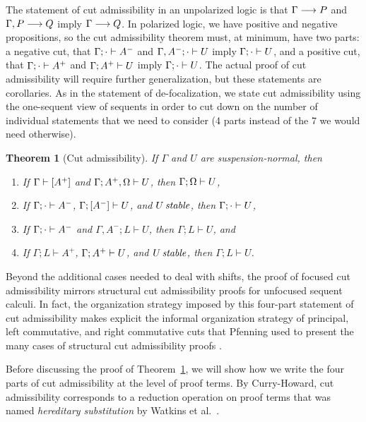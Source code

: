 \documentclass[acmtocl]{robtrans}\pdfoutput=1
\newtheorem{theorem}{Theorem}
\newcommand{\seq}[2]{{#1} \longrightarrow {#2} \mathstrut}
\newcommand{\efoc}[3]{{#1}; {#2} \vdash {#3}}
\newcommand{\rfoc}[2]{{#1} \vdash [{#2}] \mathstrut}
\newcommand{\lfoc}[3]{{#1}; [{#2}] \vdash {#3} \mathstrut}
\newcommand{\ifoc}[3]{{#1}; {#2} \vdash {#3} \mathstrut}
\newcommand{\stable}[1]{{#1}\,\mathit{stable} \mathstrut}
\begin{document}
The statement of cut admissibility in an unpolarized logic is that
$\seq{\Gamma}{P}$ and $\seq{\Gamma, P}{Q}$ imply $\seq{\Gamma}{Q}$. In
polarized logic, we have positive and negative propositions, so the
cut admissibility theorem must, at minimum, have two parts: a negative
cut, that $\ifoc{\Gamma}{\cdot}{A^-}$ and $\ifoc{\Gamma,
  A^-}{\cdot}{U}$ imply $\ifoc{\Gamma}{\cdot}{U}$, and a positive cut,
that $\ifoc{\Gamma}{\cdot}{A^+}$ and $\ifoc{\Gamma}{A^+}{U}$ imply
$\ifoc{\Gamma}{\cdot}{U}$. The actual proof of cut admissibility will
require further generalization, but these statements are corollaries.
As in the statement of de-focalization, we state cut admissibility
using the one-sequent view of sequents in order to cut down on the
number of individual statements that we need to consider (4 parts
instead of the 7 we would need otherwise).

\begin{theorem}[Cut admissibility]
If $\Gamma$ and $U$ are suspension-normal, then\label{thm:cut}

\begin{enumerate}
\item If $\rfoc{\Gamma}{A^+}$ and $\ifoc{\Gamma}{A^+, \Omega}{U}$, then
      $\ifoc{\Gamma}{\Omega}{U}$,
\item If $\ifoc{\Gamma}{\cdot}{A^-}$, $\lfoc{\Gamma}{A^-}{U}$, 
      and $\stable{U}$, then
      $\ifoc{\Gamma}{\cdot}{U}$,
\item If $\ifoc{\Gamma}{\cdot}{A^-}$ and $\efoc{\Gamma, A^-}{L}{U}$, then 
      $\efoc{\Gamma}{L}{U}$, and
\item If $\efoc{\Gamma}{L}{A^+}$, $\ifoc{\Gamma}{A^+}{U}$,
      and $\stable{U}$,
      then $\efoc{\Gamma}{L}{U}$.
\end{enumerate}
\end{theorem}

\noindent
Beyond the additional cases needed to deal with shifts, the proof of
focused cut admissibility mirrors structural cut admissibility proofs
for unfocused sequent calculi.  In fact, the organization strategy
imposed by this four-part statement of cut admissibility makes
explicit the informal organization strategy of principal, 
left commutative, and right commutative cuts that Pfenning used to
present the many cases of structural cut admissibility proofs
\cite{pfenning00structural}.  

Before discussing the proof of Theorem~\ref{thm:cut}, we will show how
we write the four parts of cut admissibility at the level of proof
terms. By Curry-Howard, cut admissibility corresponds to a reduction
operation on proof terms that was named {\it hereditary substitution}
by Watkins et al.~.
\end{document}
